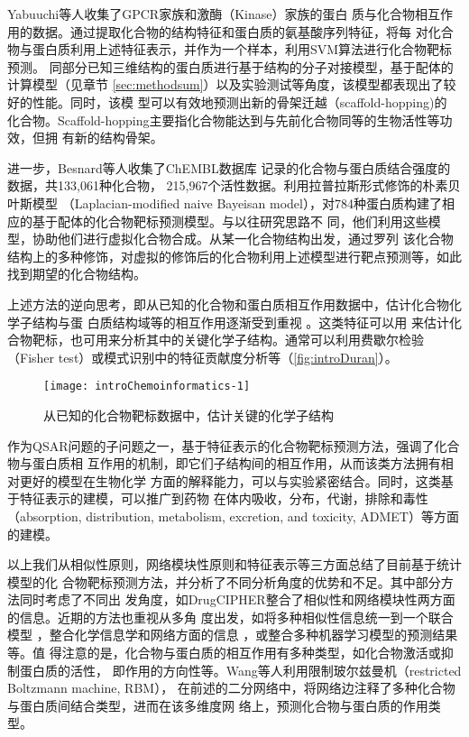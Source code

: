Yabuuchi等人\cite{yabuuchi2011analysis}收集了GPCR家族和激酶（Kinase）家族的蛋白
质与化合物相互作用的数据。通过提取化合物的结构特征和蛋白质的氨基酸序列特征，将每
对化合物与蛋白质利用上述特征表示，并作为一个样本，利用SVM算法进行化合物靶标预测。
同部分已知三维结构的蛋白质进行基于结构的分子对接模型，基于配体的计算模型（见章节
\ref{sec:methodsum}）以及实验测试等角度，该模型都表现出了较好的性能。同时，该模
型可以有效地预测出新的骨架迁越\cite{sun2012classification}（scaffold-hopping)的
化合物。Scaffold-hopping主要指化合物能达到与先前化合物同等的生物活性等功效，但拥
有新的结构骨架。

进一步，Besnard等人\cite{besnard2012automated}收集了ChEMBL数据库
\cite{bento2014chembl}记录的化合物与蛋白质结合强度的数据，共133,061种化合物，
215,967个活性数据。利用拉普拉斯形式修饰的朴素贝叶斯模型
\cite{xia2004classification,rogers2005using}（Laplacian-modified naive Bayeisan
model），对784种蛋白质构建了相应的基于配体的化合物靶标预测模型。与以往研究思路不
同，他们利用这些模型，协助他们进行虚拟化合物合成。从某一化合物结构出发，通过罗列
该化合物结构上的多种修饰，对虚拟的修饰后的化合物利用上述模型进行靶点预测等，如此
找到期望的化合物结构。

上述方法的逆向思考，即从已知的化合物和蛋白质相互作用数据中，估计化合物化学子结构与蛋
白质结构域等的相互作用逐渐受到重视
\cite{yamanishi2011extracting,duran2013analysis,duran2014chemo}。这类特征可以用
来估计化合物靶标，也可用来分析其中的关键化学子结构。通常可以利用费歇尔检验
（Fisher test）或模式识别中的特征贡献度分析等（\autoref{fig:introDuran}）。
\begin{figure}[htb]
  \centering
  \texttt{[image: introChemoinformatics-1]}
  \caption{从已知的化合物靶标数据中，估计关键的化学子结构}
  \label{fig:introDuran}
\end{figure}

作为QSAR问题的子问题之一，基于特征表示的化合物靶标预测方法，强调了化合物与蛋白质相
互作用的机制，即它们子结构间的相互作用，从而该类方法拥有相对更好的模型在生物化学
方面的解释能力，可以与实验紧密结合。同时，这类基于特征表示的建模，可以推广到药物
在体内吸收，分布，代谢，排除和毒性（absorption, distribution, metabolism,
excretion, and toxicity, ADMET）等方面的建模\cite{shen2010estimation,cheng2013prediction}。

以上我们从相似性原则，网络模块性原则和特征表示等三方面总结了目前基于统计模型的化
合物靶标预测方法，并分析了不同分析角度的优势和不足。其中部分方法同时考虑了不同出
发角度，如DrugCIPHER整合了相似性和网络模块性两方面的信息。近期的方法也重视从多角
度出发，如将多种相似性信息统一到一个联合模型
\cite{gottlieb2011predict,wu2014integrating}，整合化学信息学和网络方面的信息
\cite{wu2016sdtnbi}，或整合多种机器学习模型的预测结果\cite{yuan2016druge}等。值
得注意的是，化合物与蛋白质的相互作用有多种类型，如化合物激活或抑制蛋白质的活性，
即作用的方向性等。Wang等人利用限制玻尔兹曼机（restricted Boltzmann machine, RBM），
在前述的二分网络中，将网络边注释了多种化合物与蛋白质间结合类型，进而在该多维度网
络上，预测化合物与蛋白质的作用类型\cite{yang2014drug}。
